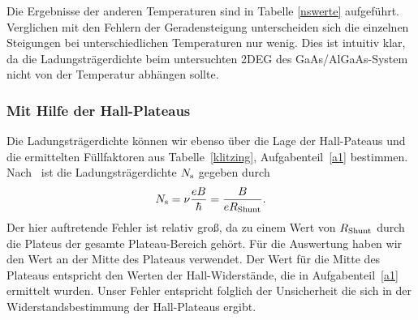 \documentclass[paper=a4,fontsize=10pt,DIV=18,twocolumn,parskip=half]{scrartcl}
\numberwithin{equation}{section}    %
\begin{document}
Die Ergebnisse der anderen Temperaturen sind in Tabelle \ref{nswerte} aufgeführt.
Verglichen mit den Fehlern der Geradensteigung unterscheiden sich die einzelnen Steigungen bei unterschiedlichen Temperaturen nur wenig. Dies ist intuitiv klar, da die Ladungsträgerdichte beim untersuchten 2DEG des GaAs/AlGaAs-System nicht von der Temperatur abhängen sollte.

\subsubsection*{Mit Hilfe der Hall-Plateaus}
Die Ladungsträgerdichte können wir ebenso über die Lage der Hall-Pateaus und die ermittelten Füllfaktoren aus Tabelle~\ref{klitzing}, Aufgabenteil~\ref{a1} bestimmen. Nach~\citet{anleitung} ist die Ladungsträgerdichte $N_{\rm s}$ gegeben durch
\begin{equation}
	N_{\rm s} = \nu\frac{e B}{\hbar} = \frac{B}{e R_{\rm Shunt}}.
\end{equation}
Der hier auftretende Fehler ist relativ groß, da zu einem Wert von $R_{\rm Shunt}$ durch die Plateus der gesamte Plateau-Bereich gehört. Für die Auswertung haben wir den Wert an der Mitte des Plateaus verwendet. Der Wert für die Mitte des Plateaus entspricht den Werten der Hall-Widerstände, die in Aufgabenteil~\ref{a1} ermittelt wurden. Unser Fehler entspricht folglich der Unsicherheit die sich in der Widerstandsbestimmung der Hall-Plateaus ergibt.
\end{document}
